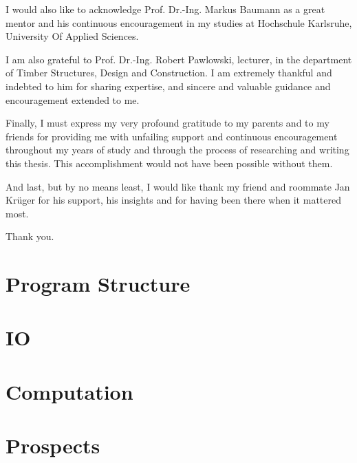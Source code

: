 \documentclass[12pt, oneside]{report}
\begin{document}
I would also like to acknowledge Prof. Dr.-Ing. Markus Baumann as a great mentor and his continuous encouragement in my studies at Hochschule Karlsruhe, University Of Applied Sciences.

I am also grateful to Prof. Dr.-Ing. Robert Pawlowski, lecturer, in the department of Timber Structures, Design and Construction. I am extremely thankful and indebted to him for sharing expertise, and sincere and valuable guidance and encouragement extended to me.

Finally, I must express my very profound gratitude to my parents and to my friends for providing me with unfailing support and continuous encouragement throughout my years of study and through the process of researching and writing this thesis. This accomplishment would not have been possible without them.

And last, but by no means least, I would like thank my friend and roommate Jan Kr\"uger for his support, his insights and for having been there when it mattered most.

Thank you.

\pagestyle{empty}

\cleardoublepage
\tableofcontents
\cleardoublepage
{}

\clearpage
\pagestyle{fancy}

\chapter{Program Structure}


\chapter{IO}


\chapter{Computation}


%

\chapter{Prospects}




\appendix

\end{document}
